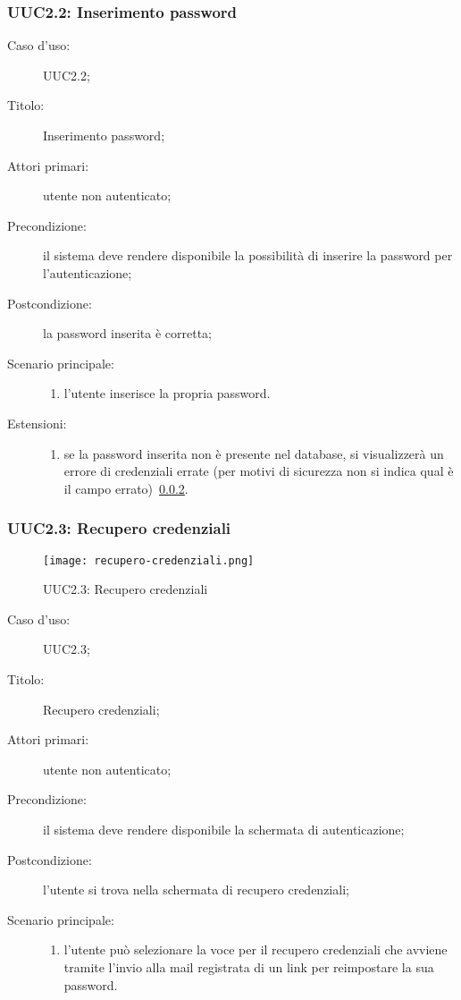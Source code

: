\documentclass[../../../analisi-dei-requisiti.tex]{subfiles}
\begin{document}
\subsubsection{UUC2.2: Inserimento password}%
\label{subs:UUC2.2}
\begin{description}
  \item[Caso d’uso:] UUC2.2;
  \item[Titolo:] Inserimento password;
  \item[Attori primari:] utente non autenticato;
  \item[Precondizione:] il sistema deve rendere disponibile la possibilità di inserire la password per l'autenticazione;
  \item[Postcondizione:] la password inserita è corretta;
  \item[Scenario principale:]
        \begin{enumerate}
          \item l'utente inserisce la propria password.
        \end{enumerate}
  \item[Estensioni:]
        \begin{enumerate}
          \item se la password inserita non è presente nel database, si visualizzerà un errore di credenziali errate (per motivi di sicurezza non si indica qual è il campo errato)~\ref{subs:UUC2.3}.
        \end{enumerate}
\end{description}

\subsubsection{UUC2.3: Recupero credenziali}%
\label{subs:UUC2.3}

\begin{figure}[H]
  \centering
  \texttt{[image: recupero-credenziali.png]}
  \caption{UUC2.3: Recupero credenziali}%
  \label{fig:uuc2_3}
\end{figure}

\begin{description}
  \item[Caso d’uso:] UUC2.3;
  \item[Titolo:] Recupero credenziali;
  \item[Attori primari:] utente non autenticato;
  \item[Precondizione:] il sistema deve rendere disponibile la schermata di autenticazione;
  \item[Postcondizione:] l'utente si trova nella schermata di recupero credenziali;
  \item[Scenario principale:]
        \begin{enumerate}
          \item l’utente può selezionare la voce per il recupero credenziali che avviene tramite l'invio alla mail registrata di un link per reimpostare la sua password.
        \end{enumerate}
\end{description}
\end{document}
